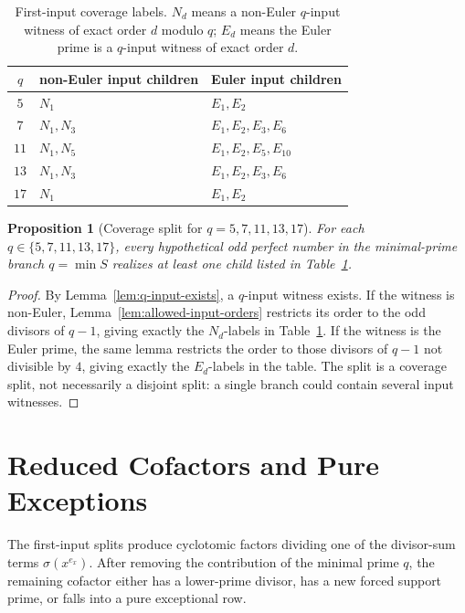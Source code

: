 \documentclass[11pt]{article}
\newtheorem{proposition}[theorem]{Proposition}
\theoremstyle{definition}
\theoremstyle{remark}
\begin{document}
\begin{table}[ht]
\centering
\small
\begin{tabular}{c|l|l}
\toprule
\(q\) & non-Euler input children & Euler input children\\
\midrule
\(5\)  & \(N_1\) & \(E_1,E_2\)\\
\(7\)  & \(N_1,N_3\) & \(E_1,E_2,E_3,E_6\)\\
\(11\) & \(N_1,N_5\) & \(E_1,E_2,E_5,E_{10}\)\\
\(13\) & \(N_1,N_3\) & \(E_1,E_2,E_3,E_6\)\\
\(17\) & \(N_1\) & \(E_1,E_2\)\\
\bottomrule
\end{tabular}
\caption{First-input coverage labels.  \(N_d\) means a non-Euler
\(q\)-input witness of exact order \(d\) modulo \(q\); \(E_d\) means the Euler
prime is a \(q\)-input witness of exact order \(d\).}
\label{tab:first-input-labels}
\end{table}

\begin{proposition}[Coverage split for \(q=5,7,11,13,17\)]
\label{prop:general-coverage-split}
For each \(q\in\{5,7,11,13,17\}\), every hypothetical odd perfect number in the
minimal-prime branch \(q=\min S\) realizes at least one child listed in
Table~\ref{tab:first-input-labels}.
\end{proposition}

\begin{proof}
By Lemma~\ref{lem:q-input-exists}, a \(q\)-input witness exists.  If the
witness is non-Euler, Lemma~\ref{lem:allowed-input-orders} restricts its order
to the odd divisors of \(q-1\), giving exactly the \(N_d\)-labels in
Table~\ref{tab:first-input-labels}.  If the witness is the Euler prime, the
same lemma restricts the order to those divisors of \(q-1\) not divisible by
\(4\), giving exactly the \(E_d\)-labels in the table.  The split is a coverage
split, not necessarily a disjoint split: a single branch could contain several
input witnesses.
\end{proof}

\section{Reduced Cofactors and Pure Exceptions}
\label{sec:cofactors}

The first-input splits produce cyclotomic factors dividing one of the
divisor-sum terms \(\sigma(x^{e_x})\).  After removing the contribution of the
minimal prime \(q\), the remaining cofactor either has a lower-prime divisor,
has a new forced support prime, or falls into a pure exceptional row.
\end{document}
